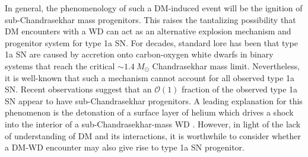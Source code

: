 \documentclass[twocolumn, preprintnumbers,amsmath,amssymb,prd, superscriptaddress]{revtex4}
\newcommand{\OO}{\mathcal{O}}
\begin{document}
In general, the phenomenology of such a DM-induced event will be the ignition of sub-Chandrasekhar mass progenitors.
This raises the tantalizing possibility that DM encounters with a WD can act as an alternative explosion mechanism and progenitor system for type 1a SN.
For decades, standard lore has been that type 1a SN are caused by accretion onto carbon-oxygen white dwarfs in binary systems that reach the critical $\sim 1.4 ~M_{\odot}$ Chandrasekhar mass limit.
Nevertheless, it is well-known that such a mechanism cannot account for all observed type 1a SN.
Recent observations \cite{Scalzo:2014sap, Scalzo:2014wxa} suggest that an $\OO(1)$ fraction of the observed type 1a SN appear to have sub-Chandrasekhar progenitors.
A leading explanation for this phenomenon is the detonation of a surface layer of helium which drives a shock into the interior of a sub-Chandrasekhar-mass WD \cite{Woosley1994,Fink:2007fv}.
However, in light of the lack of understanding of DM and its interactions, it is worthwhile to consider whether a DM-WD encounter may also give rise to type 1a SN progenitor.
\end{document}
